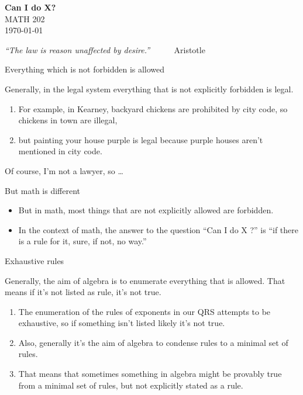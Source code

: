 \documentclass[portrait,fleqn,12pt]{beamer}
\newenvironment{handlist}
   {\begin{enumerate}[\faHandPointRight]
       \addtolength{\itemsep}{0.0\itemsep}}
     {\end{enumerate}}
\begin{document}
\begin{frame}
\begin{flushleft} 
\textbf{Can I do  X?} \\
MATH 202 \\
\today 
\end{flushleft}


\emph{“The law is reason unaffected by desire.”}  $\phantom{xxxx}$ \hfill {\sc Aristotle } 
\end{frame}


\begin{frame}[fragile]{Everything which is not forbidden is allowed}

 Generally, in the legal system everything that is not explicitly forbidden is legal.  
 
 \begin{handlist}
 \item For example, in Kearney, backyard chickens are prohibited by
 city code,  so chickens in town are illegal, 
 
 
 \item but painting your house purple is legal because purple houses aren't mentioned in city code.

 \end{handlist}
 
 
 Of course, I'm not a lawyer, so \dots
 \end{frame}
 
 \begin{frame}{But math is different}
 
\begin{itemize}
\item[\faHandPointRight]But in math, most things that are  not explicitly allowed are forbidden.

\item[\faHandPointRight] In the context of math,  the answer to the question ``Can I do X ?''  is ``if there is a rule for it, sure, if not, no way.''


\end{itemize}

\end{frame}

\begin{frame}{Exhaustive rules}

Generally, the aim of algebra is to enumerate everything that is allowed. That means if it's not listed as rule, it's not true.

\begin{handlist}
\item The enumeration of the rules of exponents in our QRS attempts to  be exhaustive, so if something isn't listed likely
it's not true.

\item Also, generally it's the aim of algebra to condense rules to a minimal set of rules.  


\item That means that sometimes something
in algebra might be provably true from a minimal set of rules, but not explicitly stated as a rule.

\end{handlist}

\end{frame}
\end{document}
